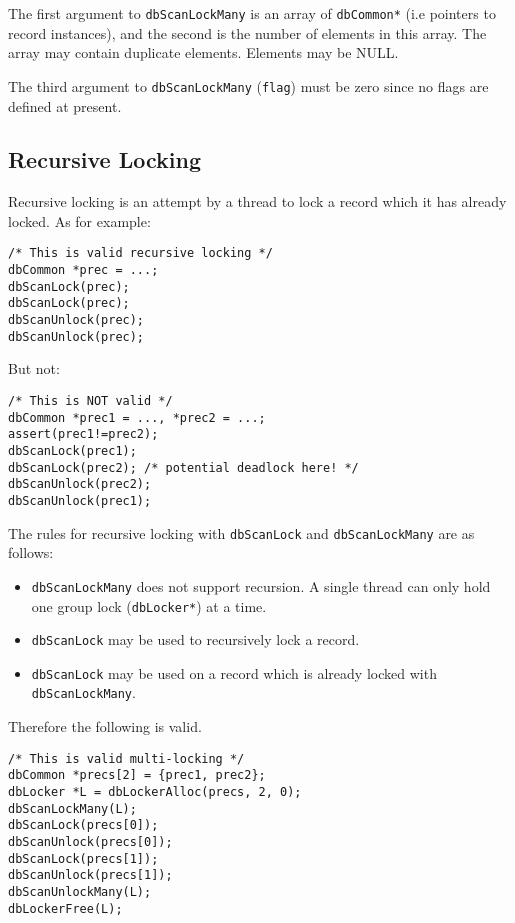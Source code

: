 The first argument to \verb|dbScanLockMany| is an array of \verb|dbCommon*|
(i.e pointers to record instances), and the second is the number of elements in this array.
The array may contain duplicate elements.
Elements may be NULL.

The third argument to \verb|dbScanLockMany| (\verb|flag|) must be zero since no flags are defined at present.

\subsection{Recursive Locking}
\label{sec:recursivelocking}

Recursive locking is an attempt by a thread to lock a record which it has already locked.
As for example:

\begin{verbatim}
/* This is valid recursive locking */
dbCommon *prec = ...;
dbScanLock(prec);
dbScanLock(prec);
dbScanUnlock(prec);
dbScanUnlock(prec);
\end{verbatim}

But not:

\begin{verbatim}
/* This is NOT valid */
dbCommon *prec1 = ..., *prec2 = ...;
assert(prec1!=prec2);
dbScanLock(prec1);
dbScanLock(prec2); /* potential deadlock here! */
dbScanUnlock(prec2);
dbScanUnlock(prec1);
\end{verbatim}

The rules for recursive locking with \verb|dbScanLock| and \verb|dbScanLockMany| are as follows:

\begin{itemize}
\item \verb|dbScanLockMany| does not support recursion.
A single thread can only hold one group lock (\verb|dbLocker*|) at a time.
\item \verb|dbScanLock| may be used to recursively lock a record.
\item \verb|dbScanLock| may be used on a record which is already locked with \verb|dbScanLockMany|.
\end{itemize}

Therefore the following is valid.

\begin{verbatim}
/* This is valid multi-locking */
dbCommon *precs[2] = {prec1, prec2};
dbLocker *L = dbLockerAlloc(precs, 2, 0);
dbScanLockMany(L);
dbScanLock(precs[0]);
dbScanUnlock(precs[0]);
dbScanLock(precs[1]);
dbScanUnlock(precs[1]);
dbScanUnlockMany(L);
dbLockerFree(L);
\end{verbatim}

